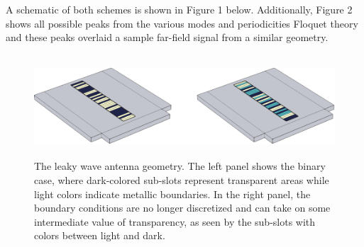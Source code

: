 \documentclass[11pt]{article}
\begin{document}
\noindent A schematic of both schemes is shown in Figure 1 below. Additionally, Figure 2 shows all possible peaks from the various modes and periodicities Floquet theory and these peaks overlaid a sample far-field signal from a similar geometry.

\begin{figure}
		\centering
		\includegraphics[height=1.5in]{figures/fig5pdf}
		\caption{The leaky wave antenna geometry. The left panel shows the binary case, where dark-colored sub-slots represent transparent areas while light colors indicate metallic boundaries. In the right panel, the boundary conditions are no longer discretized and can take on some intermediate value of transparency, as seen by the sub-slots with colors between light and dark.}
\end{figure}




\end{document}
